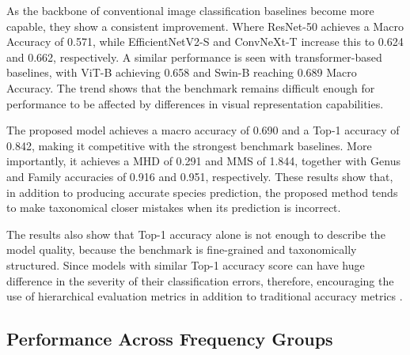\documentclass[preprint,12pt]{elsarticle}
\begin{document}
As the backbone of conventional image classification baselines become
more capable, they show a consistent improvement. Where ResNet-50
\citep{ref39} achieves a Macro Accuracy of 0.571,
while EfficientNetV2-S \citep{ref40} and
ConvNeXt-T \citep{ref41} increase this to 0.624
and 0.662, respectively. A similar performance is seen with
transformer-based baselines, with ViT-B achieving 0.658
\citep{ref36} and Swin-B
\citep{ref38} reaching 0.689 Macro Accuracy. The
trend shows that the benchmark remains difficult enough for performance
to be affected by differences in visual representation capabilities.

The proposed model achieves a macro accuracy of 0.690 and a Top-1
accuracy of 0.842, making it competitive with the strongest benchmark
baselines. More importantly, it achieves a MHD of 0.291 and MMS of
1.844, together with Genus and Family accuracies of 0.916 and 0.951,
respectively. These results show that, in addition to producing accurate
species prediction, the proposed method tends to make taxonomical closer
mistakes when its prediction is incorrect.

The results also show that Top-1 accuracy alone is not enough to
describe the model quality, because the benchmark is fine-grained and
taxonomically structured. Since models with similar Top-1 accuracy score
can have huge difference in the severity of their classification errors,
therefore, encouraging the use of hierarchical evaluation metrics in
addition to traditional accuracy metrics
\citep{ref24}.

\subsection{Performance Across Frequency
Groups}\label{performance-across-frequency-groups}
\end{document}
